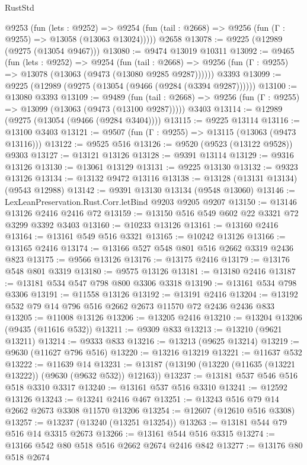 \begin{lexlean}{RustStd}
\begin{coremodule}
    @9253
      (fun (lets : @9252) =>
      @9254 (fun (tail : @2668) => @9256 (fun (Γ : @9255) => @13058 (@13063 @13024)))))
    @2658
@13078 := @9225 (@12989 (@9275 (@13054 @9467)))
@13080 := @9474 @13019 @10311
@13092 := @9465
    (fun (lets : @9252) =>
    @9254
      (fun (tail : @2668) =>
      @9256 (fun (Γ : @9255) => @13078 (@13063 (@9473 (@13080 @9285 @9287))))))
    @3393
@13099 := @9225 (@12989 (@9275 (@13054 (@9466 (@9284 (@3394 @9287))))))
@13100 := @13080 @3393
@13109 := @9489
    (fun (tail : @2668) => @9256 (fun (Γ : @9255) => @13099 (@13063 (@9473 (@13100 @9287)))))
    @3403
@13114 := @12989 (@9275 (@13054 (@9466 (@9284 @3404))))
@13115 := @9225 @13114
@13116 := @13100 @3403
@13121 := @9507 (fun (Γ : @9255) => @13115 (@13063 (@9473 @13116)))
@13122 := @9525 @516
@13126 := @9520 (@9523 (@13122 @9528)) @9303
@13127 := @13121 @13126
@13128 := @9391 @13114
@13129 := @9316 @13126
@13130 := @13061 @13129
@13131 := @9225 @13130
@13132 := @9323 @13126
@13134 := @13132 @9472 @13116
@13138 := @13128 (@13131 @13134) (@9543 @12988)
@13142 := @9391 @13130 @13134 (@9548 @13060)
@13146 := LexLeanPreservation.Rust.Corr.letBind @9203 @9205 @9207
@13150 := @13146 @13126 @2416 @2416 @72
@13159 := @13150 @516 @549 @602 @22 @3321 @72 @3299 @3392 @3403
@13160 := @10233 @13126
@13161 := @13160 @2416
@13164 := @13161 @549 @516 @3321
@13165 := @10242 @13126
@13166 := @13165 @2416
@13174 := @13166 @527 @548 @801 @516 @2662 @3319 @2436 @823
@13175 := @9566 @13126
@13176 := @13175 @2416
@13179 := @13176 @548 @801 @3319
@13180 := @9575 @13126
@13181 := @13180 @2416
@13187 := @13181 @534 @547 @798 @800 @3306 @3318
@13190 := @13161 @534 @798 @3306
@13191 := @11558 @13126
@13192 := @13191 @2416
@13204 := @13192 @532 @79 @14 @796 @516 @2662 @2673 @11570 @72 @2436 @2436 @833
@13205 := @11008 @13126
@13206 := @13205 @2416
@13210 := @13204 @13206 (@9435 (@11616 @532))
@13211 := @9309 @833
@13213 := @13210 (@9621 @13211)
@13214 := @9333 @833
@13216 := @13213 (@9625 @13214)
@13219 := @9630 (@11627 @796 @516)
@13220 := @13216 @13219
@13221 := @11637 @532
@13222 := @11639 @14
@13231 := @13187 (@13190 (@13220 (@11635 (@13221 @13222)) (@9630 (@9632 @532)) @12163))
@13237 := @13181 @537 @546 @516 @518 @3310 @3317
@13240 := @13161 @537 @516 @3310
@13241 := @12592 @13126
@13243 := @13241 @2416 @467
@13251 := @13243 @516 @79 @14 @2662 @2673 @3308 @11570 @13206
@13254 := @12607 (@12610 @516 @3308)
@13257 := @13237 (@13240 (@13251 @13254))
@13263 := @13181 @544 @79 @516 @14 @3315 @2673
@13266 := @13161 @544 @516 @3315
@13274 := @13166 @542 @80 @518 @516 @2662 @2674 @2416 @842
@13277 := @13176 @80 @518 @2674

\end{coremodule}
\end{lexlean}
